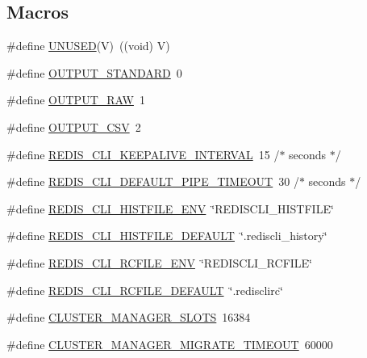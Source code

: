 \subsection*{Macros}
\begin{DoxyCompactItemize}
\item 
\#define \hyperlink{redis-cli_8c_ae7c9dc8f13568a9c856573751f1ee1ec}{U\+N\+U\+S\+ED}(V)~((void) V)
\item 
\#define \hyperlink{redis-cli_8c_abf624f04f4590979c3c3944bc7f94d6e}{O\+U\+T\+P\+U\+T\+\_\+\+S\+T\+A\+N\+D\+A\+RD}~0
\item 
\#define \hyperlink{redis-cli_8c_a4f47017b54da140967dcbd440fae227c}{O\+U\+T\+P\+U\+T\+\_\+\+R\+AW}~1
\item 
\#define \hyperlink{redis-cli_8c_a55fcc3cb9516c34eebf22ac9f8ebf3a2}{O\+U\+T\+P\+U\+T\+\_\+\+C\+SV}~2
\item 
\#define \hyperlink{redis-cli_8c_a5405864d5b0d191cc176105325fab907}{R\+E\+D\+I\+S\+\_\+\+C\+L\+I\+\_\+\+K\+E\+E\+P\+A\+L\+I\+V\+E\+\_\+\+I\+N\+T\+E\+R\+V\+AL}~15 /$\ast$ seconds $\ast$/
\item 
\#define \hyperlink{redis-cli_8c_aa509dd2ea6ba533a33b1537622c215da}{R\+E\+D\+I\+S\+\_\+\+C\+L\+I\+\_\+\+D\+E\+F\+A\+U\+L\+T\+\_\+\+P\+I\+P\+E\+\_\+\+T\+I\+M\+E\+O\+UT}~30 /$\ast$ seconds $\ast$/
\item 
\#define \hyperlink{redis-cli_8c_a4aaf4b657b3305064e3da87ac88a95f9}{R\+E\+D\+I\+S\+\_\+\+C\+L\+I\+\_\+\+H\+I\+S\+T\+F\+I\+L\+E\+\_\+\+E\+NV}~\char`\"{}R\+E\+D\+I\+S\+C\+L\+I\+\_\+\+H\+I\+S\+T\+F\+I\+LE\char`\"{}
\item 
\#define \hyperlink{redis-cli_8c_ab1ba16fc9e98d602260f42a49de9a61c}{R\+E\+D\+I\+S\+\_\+\+C\+L\+I\+\_\+\+H\+I\+S\+T\+F\+I\+L\+E\+\_\+\+D\+E\+F\+A\+U\+LT}~\char`\"{}.rediscli\+\_\+history\char`\"{}
\item 
\#define \hyperlink{redis-cli_8c_abb8e34d308514b1e024e39d127046df0}{R\+E\+D\+I\+S\+\_\+\+C\+L\+I\+\_\+\+R\+C\+F\+I\+L\+E\+\_\+\+E\+NV}~\char`\"{}R\+E\+D\+I\+S\+C\+L\+I\+\_\+\+R\+C\+F\+I\+LE\char`\"{}
\item 
\#define \hyperlink{redis-cli_8c_a0764031c702054d021e64f66271b56e3}{R\+E\+D\+I\+S\+\_\+\+C\+L\+I\+\_\+\+R\+C\+F\+I\+L\+E\+\_\+\+D\+E\+F\+A\+U\+LT}~\char`\"{}.redisclirc\char`\"{}
\item 
\#define \hyperlink{redis-cli_8c_adff5eca00afc90a8c3c213bb7100cdc0}{C\+L\+U\+S\+T\+E\+R\+\_\+\+M\+A\+N\+A\+G\+E\+R\+\_\+\+S\+L\+O\+TS}~16384
\item 
\#define \hyperlink{redis-cli_8c_a78b3cb1ab88e7abe0c471fd476204121}{C\+L\+U\+S\+T\+E\+R\+\_\+\+M\+A\+N\+A\+G\+E\+R\+\_\+\+M\+I\+G\+R\+A\+T\+E\+\_\+\+T\+I\+M\+E\+O\+UT}~60000

\end{DoxyCompactItemize}
